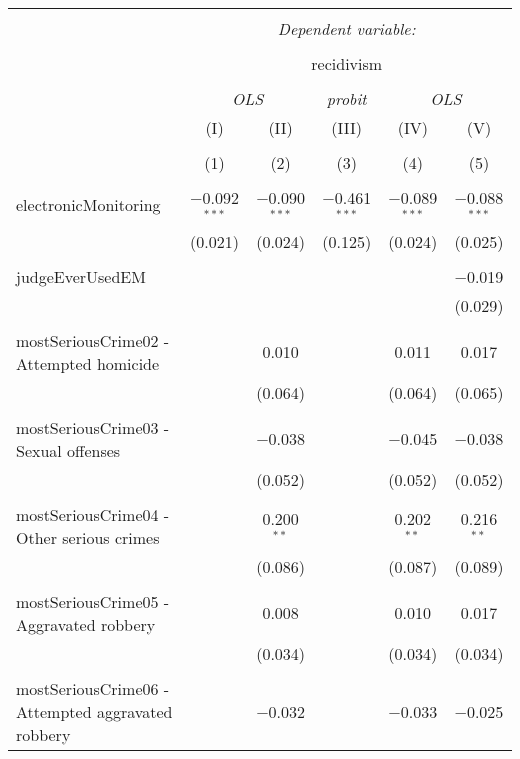 
\begin{table}[!htbp] \centering 
  \caption{} 
  \label{} 
\begin{tabular}{@{\extracolsep{5pt}}lccccc} 
\\[-1.8ex]\hline 
\hline \\[-1.8ex] 
 & \multicolumn{5}{c}{\textit{Dependent variable:}} \\ 
\cline{2-6} 
\\[-1.8ex] & \multicolumn{5}{c}{recidivism} \\ 
\\[-1.8ex] & \multicolumn{2}{c}{\textit{OLS}} & \textit{probit} & \multicolumn{2}{c}{\textit{OLS}} \\ 
 & (I) & (II) & (III) & (IV) & (V) \\ 
\\[-1.8ex] & (1) & (2) & (3) & (4) & (5)\\ 
\hline \\[-1.8ex] 
 electronicMonitoring & $-$0.092$^{***}$ & $-$0.090$^{***}$ & $-$0.461$^{***}$ & $-$0.089$^{***}$ & $-$0.088$^{***}$ \\ 
  & (0.021) & (0.024) & (0.125) & (0.024) & (0.025) \\ 
  & & & & & \\ 
 judgeEverUsedEM &  &  &  &  & $-$0.019 \\ 
  &  &  &  &  & (0.029) \\ 
  & & & & & \\ 
 mostSeriousCrime02 - Attempted homicide &  & 0.010 &  & 0.011 & 0.017 \\ 
  &  & (0.064) &  & (0.064) & (0.065) \\ 
  & & & & & \\ 
 mostSeriousCrime03 - Sexual offenses &  & $-$0.038 &  & $-$0.045 & $-$0.038 \\ 
  &  & (0.052) &  & (0.052) & (0.052) \\ 
  & & & & & \\ 
 mostSeriousCrime04 - Other serious crimes &  & 0.200$^{**}$ &  & 0.202$^{**}$ & 0.216$^{**}$ \\ 
  &  & (0.086) &  & (0.087) & (0.089) \\ 
  & & & & & \\ 
 mostSeriousCrime05 - Aggravated robbery &  & 0.008 &  & 0.010 & 0.017 \\ 
  &  & (0.034) &  & (0.034) & (0.034) \\ 
  & & & & & \\ 
 mostSeriousCrime06 - Attempted aggravated robbery &  & $-$0.032 &  & $-$0.033 & $-$0.025 \\ 

\end{tabular}
\end{table}
